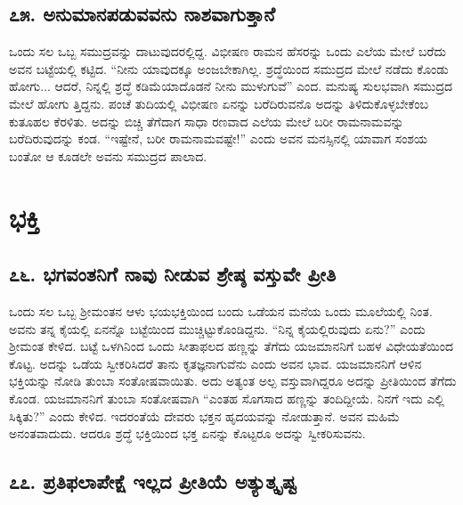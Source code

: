 \section{\num{೭೫.} ಅನುಮಾನಪಡುವವನು ನಾಶವಾಗುತ್ತಾನೆ}

ಒಂದು ಸಲ ಒಬ್ಬ ಸಮುದ್ರವನ್ನು ದಾಟುವುದರಲ್ಲಿದ್ದ. ವಿಭೀಷಣ ರಾಮನ ಹೆಸರನ್ನು ಒಂದು ಎಲೆಯ ಮೇಲೆ ಬರೆದು ಅವನ ಬಟ್ಟೆಯಲ್ಲಿ ಕಟ್ಟಿದ. “ನೀನು ಯಾವುದಕ್ಕೂ ಅಂಜಬೇಕಾಗಿಲ್ಲ. ಶ್ರದ್ಧೆಯಿಂದ ಸಮುದ್ರದ ಮೇಲೆ ನಡೆದು ಕೊಂಡು ಹೋಗು... ಆದರೆ, ನಿನ್ನಲ್ಲಿ ಶ್ರದ್ಧೆ ಕಡಿಮೆಯಾದೊಡನೆ ನೀನು ಮುಳುಗುವೆ” ಎಂದ. ಮನುಷ್ಯ ಸುಲಭವಾಗಿ ಸಮುದ್ರದ ಮೇಲೆ ಹೋಗು ತ್ತಿದ್ದನು. ಪಂಚೆ ತುದಿಯಲ್ಲಿ ವಿಭೀಷಣ ಏನನ್ನು ಬರೆದಿರುವನೊ ಅದನ್ನು ತಿಳಿದುಕೊಳ್ಳಬೇಕೆಂಬ ಕುತೂಹಲ ಕೆರಳಿತು. ಅದನ್ನು ಬಿಚ್ಚಿ ತೆಗೆದಾಗ ಸಾಧಾ ರಣವಾದ ಎಲೆಯ ಮೇಲೆ ಬರೀ ರಾಮನಾಮವನ್ನು ಬರೆದಿರುವುದನ್ನು ಕಂಡ. “ಇಷ್ಟೇನೆ, ಬರೀ ರಾಮನಾಮವಷ್ಟೇ!” ಎಂದು ಅವನ ಮನಸ್ಸಿನಲ್ಲಿ ಯಾವಾಗ ಸಂಶಯ ಬಂತೋ ಆ ಕೂಡಲೇ ಅವನು ಸಮುದ್ರದ ಪಾಲಾದ.

\chapter{ಭಕ್ತಿ}

\section{\num{೭೬.} ಭಗವಂತನಿಗೆ ನಾವು ನೀಡುವ ಶ್ರೇಷ್ಠ ವಸ್ತುವೇ ಪ್ರೀತಿ}

ಒಂದು ಸಲ ಒಬ್ಬ ಶ್ರೀಮಂತನ ಆಳು ಭಯಭಕ್ತಿಯಿಂದ ಬಂದು ಒಡೆಯನ ಮನೆಯ ಒಂದು ಮೂಲೆಯಲ್ಲಿ ನಿಂತ. ಅವನು ತನ್ನ ಕೈಯಲ್ಲಿ ಏನನ್ನೊ ಬಟ್ಟೆಯಿಂದ ಮುಚ್ಚಿಟ್ಟುಕೊಂಡಿದ್ದನು. “ನಿನ್ನ ಕೈಯಲ್ಲಿರುವುದು ಏನು?” ಎಂದು ಶ್ರೀಮಂತ ಕೇಳಿದ. ಬಟ್ಟೆ ಒಳಗಿನಿಂದ ಒಂದು ಸೀತಾಫಲದ ಹಣ್ಣನ್ನು ತೆಗೆದು ಯಜಮಾನನಿಗೆ ಬಹಳ ವಿಧೇಯತೆಯಿಂದ ಕೊಟ್ಟ. ಅದನ್ನು ಒಡೆಯ ಸ್ವೀಕರಿಸಿದರೆ ತಾನು ಕೃತಜ್ಞನಾಗುವೆನು ಎಂದು ಅವನ ಭಾವ. ಯಜಮಾನನಿಗೆ ಆಳಿನ ಭಕ್ತಿಯನ್ನು ನೋಡಿ ತುಂಬಾ ಸಂತೋಷವಾಯಿತು. ಅದು ಅತ್ಯಂತ ಅಲ್ಪ ವಸ್ತುವಾಗಿದ್ದರೂ ಅದನ್ನು ಪ್ರೀತಿಯಿಂದ ತೆಗೆದು ಕೊಂಡ. ಯಜಮಾನನಿಗೆ ತುಂಬಾ ಸಂತೋಷವಾಗಿ “ಎಂತಹ ಸೊಗಸಾದ ಹಣ್ಣನ್ನು ತಂದಿದ್ದೀಯೆ. ನಿನಗೆ ಇದು ಎಲ್ಲಿ ಸಿಕ್ಕಿತು?” ಎಂದು ಕೇಳಿದ. ಇದರಂತೆಯೆ ದೇವರು ಭಕ್ತನ ಹೃದಯವನ್ನು ನೋಡುತ್ತಾನೆ. ಅವನ ಮಹಿಮೆ ಅನಂತವಾದುದು. ಆದರೂ ಶ್ರದ್ಧೆ ಭಕ್ತಿಯಿಂದ ಭಕ್ತ ಏನನ್ನು ಕೊಟ್ಟರೂ ಅದನ್ನು ಸ್ವೀಕರಿಸುವನು.


\section{\num{೭೭. } ಪ್ರತಿಫಲಾಪೇಕ್ಷೆ ಇಲ್ಲದ ಪ್ರೀತಿಯೆ ಅತ್ಯುತ್ಕೃಷ್ಟ}

